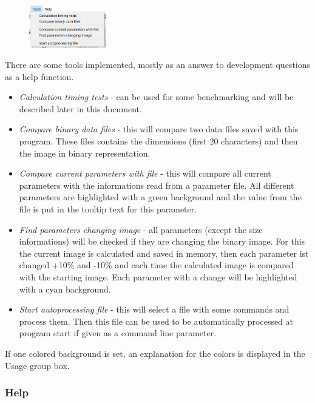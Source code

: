 \documentclass[11pt]{article} %
\begin{document}
\begin{figure}
  \begin{center}
    \includegraphics[width=0.30\textwidth]{menu-tools.png}
  \end{center}
\end{figure}
There are some tools implemented, mostly as an answer to development questions as a help function.
\begin{itemize}\itemsep0pt
\item {\it Calculation timing tests} - can be used for some benchmarking and will be described later in this document.
\item {\it Compare binary data files} - this will compare two data files saved with this program. These files contains the dimensions (first 20 characters) and then the image in binary representation.
\item {\it Compare current parameters with file} - this will compare all current parameters with the informations read from a parameter file. All different parameters are highlighted with a green background and the value from the file is put in the tooltip text for this parameter.
\item {\it Find parameters changing image} - all parameters (except the size informations) will be checked if they are changing the binary image. For this the current image is calculated and saved in memory, then each parameter ist changed +10\% and -10\% and each time the calculated image is compared with the starting image. Each parameter with a change will be highlighted with a cyan background.
\item {\it Start autoprocessing file} - this will select a file with some commands and process them. Then this file can be used to be automatically processed at program start if given as a command line parameter.
\end{itemize}
If one colored background is set, an explanation for the colors is displayed in the Usage group box.

\subsubsection{Help}
\end{document}
